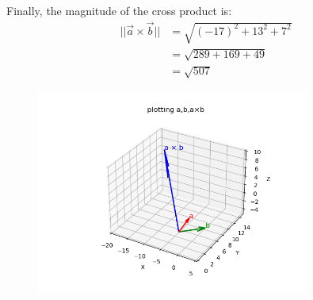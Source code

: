 \documentclass[journal]{IEEEtran}
\begin{document}
Finally, the magnitude of the cross product is:
\begin{align}
||\Vec{a} \times \Vec{b}||&= \sqrt{(-17)^2 + 13^2 + 7^2} \\
&= \sqrt{289 + 169 + 49} \\
&= \sqrt{507}
\end{align}

\begin{figure}[h!]
    \centering
    \includegraphics[width=0.8\textwidth]{figs/plot.png}
    \caption{}
    \label{fig:cross product}
\end{figure}
\end{document}
